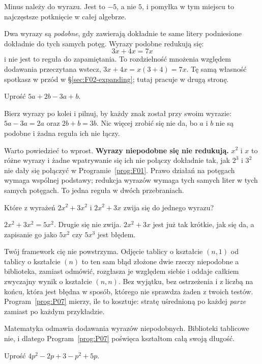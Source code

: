 \begin{fr}
Minus należy do wyrazu. Jest to $-5$, a nie $5$, i pomyłka w tym miejscu to
najczęstsze potknięcie w całej algebrze.

Dwa wyrazy są \emph{podobne}, gdy zawierają dokładnie te same litery podniesione
dokładnie do tych samych potęg. Wyrazy podobne redukują się:
\[ 3x + 4x = 7x \]
i nie jest to reguła do zapamiętania. To rozdzielność mnożenia względem
dodawania przeczytana wstecz, $3x + 4x = x(3 + 4) = 7x$. Tę samą własność
spotkasz w przód w \S\ref{sec:F02-expanding}; tutaj pracuje w drugą stronę.

Uprość $5a + 2b - 3a + b$.
\dotline
\nextframe
\end{fr}

\begin{fr}
Bierz wyrazy po kolei i pilnuj, by każdy znak został przy swoim wyrazie:
$5a - 3a = 2a$ oraz $2b + b = 3b$. Nic więcej zrobić się nie da, bo $a$ i $b$
nie są podobne i żadna reguła ich nie łączy.

Warto powiedzieć to wprost. \textbf{Wyrazy niepodobne się nie redukują.}
$x^{2}$ i $x$ to różne wyrazy i żadne wpatrywanie się ich nie połączy \dash{}
dokładnie tak, jak $2^{3}$ i $3^{2}$ nie dały się połączyć w
Programie~\ref{prog:F01}. Prawo działań na potęgach wymaga wspólnej podstawy;
redukcja wyrazów wymaga tych samych liter w tych samych potęgach. To jedna
reguła w dwóch przebraniach.

Które z wyrażeń $2x^{2} + 3x^{2}$ i $2x^{2} + 3x$ zwija się do jednego wyrazu?
\nextframe
\end{fr}

\begin{fr}
\begin{ansblock}
$2x^{2} + 3x^{2} = 5x^{2}$. Drugie się nie zwija. $2x^{2} + 3x$ jest już tak
krótkie, jak się da, a zapisanie go jako $5x^{2}$ czy $5x^{3}$ jest błędem.
\end{ansblock}

\begin{warning}
Twój framework cię nie powstrzyma. Odjęcie tablicy o kształcie $(n,1)$ od
tablicy o kształcie $(n)$ to ten sam błąd \dash{} złożone dwie rzeczy
niepodobne \dash{} a biblioteka, zamiast odmówić, rozgłasza je względem siebie
i oddaje całkiem zwyczajny wynik o kształcie $(n,n)$. Bez wyjątku, bez
ostrzeżenia i z liczbą na końcu, która jest błędna w sposób, którego nie
sprawdza żaden z twoich testów. Program~\ref{prog:P07} mierzy, ile to kosztuje:
stratę uśrednioną po każdej \emph{parze} zamiast po każdym przykładzie.

Matematyka odmawia dodawania wyrazów niepodobnych. Biblioteki tablicowe nie, i
dlatego Program~\ref{prog:P07} poświęca kształtom całą swoją długość.
\end{warning}

\yourturn
Uprość $4p^{2} - 2p + 3 - p^{2} + 5p$.
\dotline
\nextframe
\end{fr}

